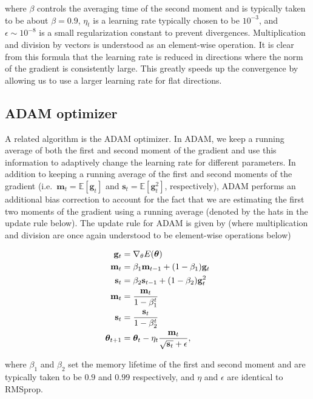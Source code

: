 \documentclass[%
oneside,                 %
final,                   %
10pt]{article}
\begin{document}
where $\beta$ controls the averaging time of the second moment and is
typically taken to be about $\beta=0.9$, $\eta_t$ is a learning rate
typically chosen to be $10^{-3}$, and $\epsilon\sim 10^{-8} $ is a
small regularization constant to prevent divergences. Multiplication
and division by vectors is understood as an element-wise operation. It
is clear from this formula that the learning rate is reduced in
directions where the norm of the gradient is consistently large. This
greatly speeds up the convergence by allowing us to use a larger
learning rate for flat directions.


\subsection*{ADAM optimizer}

A related algorithm is the ADAM optimizer. In ADAM, we keep a running
average of both the first and second moment of the gradient and use
this information to adaptively change the learning rate for different
parameters. In addition to keeping a running average of the first and
second moments of the gradient
(i.e.~$\mathbf{m}_t=\mathbb{E}[\mathbf{g}_t]$ and
$\mathbf{s}_t=\mathbb{E}[\mathbf{g}^2_t]$, respectively), ADAM
performs an additional bias correction to account for the fact that we
are estimating the first two moments of the gradient using a running
average (denoted by the hats in the update rule below). The update
rule for ADAM is given by (where multiplication and division are once
again understood to be element-wise operations below)

\begin{align}
\mathbf{g}_t &= \nabla_\theta E(\boldsymbol{\theta}) \\
\mathbf{m}_t &= \beta_1 \mathbf{m}_{t-1} + (1-\beta_1) \mathbf{g}_t \nonumber \\
\mathbf{s}_t &=\beta_2 \mathbf{s}_{t-1} +(1-\beta_2)\mathbf{g}_t^2 \nonumber \\
\bm{\mathbf{m}}_t&={\mathbf{m}_t \over 1-\beta_1^t} \nonumber \\
\bm{\mathbf{s}}_t &={\mathbf{s}_t \over1-\beta_2^t} \nonumber \\
\boldsymbol{\theta}_{t+1}&=\boldsymbol{\theta}_t - \eta_t { \bm{\mathbf{m}}_t \over \sqrt{\bm{\mathbf{s}}_t} +\epsilon}, \nonumber \\
\end{align}

where $\beta_1$ and $\beta_2$ set the memory lifetime of the first and
second moment and are typically taken to be $0.9$ and $0.99$
respectively, and $\eta$ and $\epsilon$ are identical to RMSprop.
\end{document}
